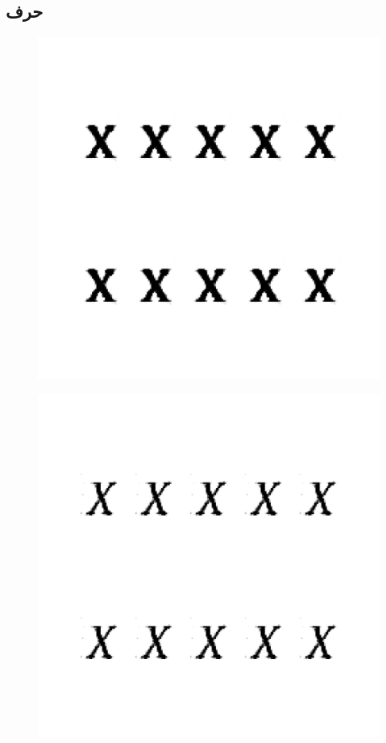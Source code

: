\documentclass{article}
\begin{document}
\subsection{حرف }
\begin{figure}[H]
	\centerline{\includegraphics[width=\textwidth , height=\textheight ]{../results/CGAN_Adam/figs/letters/X/95.pdf}}
\end{figure}
\begin{figure}[H]
	\centerline{\includegraphics[width=\textwidth , height=\textheight ]{../results/CGAN_Adam/figs/letters/X/90.pdf}}
\end{figure}
\end{document}
